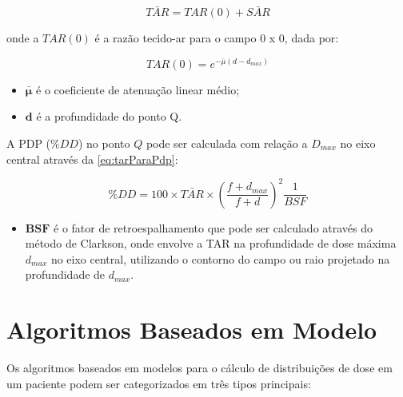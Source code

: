 \documentclass[11pt,a4paper]{article}
\newcounter{exemplo}
\begin{document}
		\begin{equation}
			\bar{TAR} = TAR(0) + \bar{SAR}
		\end{equation}

	onde a $TAR(0)$ é a razão tecido-ar para o campo 0 x 0, dada por:

		$$TAR(0) = e^{-\bar{\mu} (d - d_{max})}$$

	\begin{exemplo}[onde:]
		\begin{itemize}
			\item \textcolor{CarnationPink}{$\mathbf{\bar{\mu}}$} é o coeficiente de atenuação linear médio;
			\item \textcolor{CarnationPink}{$\mathbf{d}$} é a profundidade do ponto Q.
		\end{itemize}
	\end{exemplo}

	A PDP ($\%DD$) no ponto $Q$ pode ser calculada com relação a $D_{max}$ no eixo central através da \ref{eq:tarParaPdp}:

		\begin{equation}
			\%DD = 100 \times \bar{TAR} \times \left(\frac{f + d_{max}}{f + d}\right)^2 \frac{1}{BSF}
		\end{equation}

	\begin{exemplo}[onde:]
		\begin{itemize}
			\item \textcolor{CarnationPink}{$\mathbf{BSF}$} é o fator de retroespalhamento que pode ser calculado através do método de Clarkson, onde envolve a TAR na profundidade de dose máxima $d_{max}$ no eixo central, utilizando o contorno do campo ou raio projetado na profundidade de $d_{max}$.
		\end{itemize}
	\end{exemplo}

\section{Algoritmos Baseados em Modelo}

	Os algoritmos baseados em modelos para o cálculo de distribuições de dose em um paciente podem ser categorizados em três tipos principais:
\end{document}
